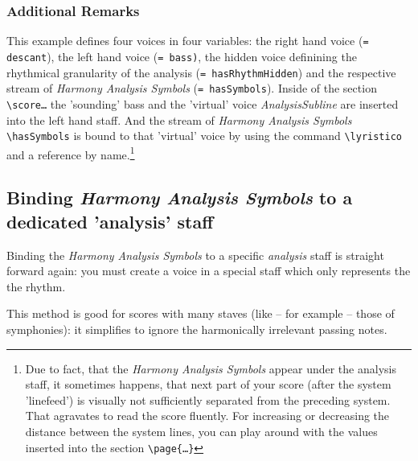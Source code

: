 \documentclass[
  DIV=calc,
  BCOR=5mm,
  12pt,
  headings=small,
  oneside,
  abstract=true,
  toc=bib,
  xcolor=dvipsnames,
  openany,
  ngerman,english]{scrartcl}
\newcommand{\acc}[0]{\textit}
\newcommand{\has}[1]{\textit{Harmony Analysis Symbol#1}}
\begin{document}
\subsubsection{Additional Remarks}

This example defines four voices in four variables: the right hand voice
(\texttt{= descant}), the left hand voice (\texttt{= bass)}, the hidden voice
definining the rhythmical granularity of the analysis (\texttt{=
hasRhythmHidden}) and the respective stream of \has{s} (\texttt{= hasSymbols}).
Inside of the section \texttt{\textbackslash score{\ldots}} the 'sounding' bass
and the 'virtual' voice \acc{AnalysisSubline} are inserted into the left hand
staff. And the stream of \has{s} \texttt{\textbackslash hasSymbols} is bound to
that 'virtual' voice by using the command \texttt{\textbackslash lyristico} and
a reference by name.\footnote{Due to fact, that the \has{s} appear under the
analysis staff, it sometimes happens, that next part of your score (after the
system 'linefeed') is visually not sufficiently separated from the preceding
system. That agravates to read the score fluently. For increasing or decreasing
the distance between the system lines, you can play around with the values
inserted into the section \texttt{\textbackslash page\{\ldots\}}}


\subsection{Binding \has{s} to a dedicated 'analysis' staff}

Binding the \has{s} to a specific \acc{analysis} staff is straight forward
again: you must create a voice in a special staff which only represents the
the rhythm. 

This method is good for scores with many staves (like -- for example -- those of
symphonies): it simplifies to ignore the harmonically irrelevant passing notes.
\end{document}
